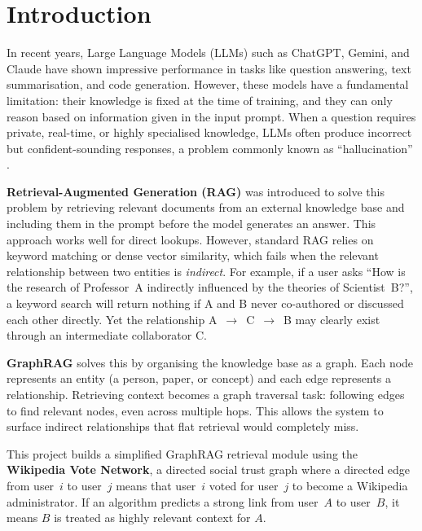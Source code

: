 \documentclass[10pt]{article}
\begin{document}
\section{Introduction}
\label{sec:intro}

In recent years, Large Language Models (LLMs) such as ChatGPT, Gemini, and Claude have shown impressive performance in tasks like question answering, text summarisation, and code generation. However, these models have a fundamental limitation: their knowledge is fixed at the time of training, and they can only reason based on information given in the input prompt. When a question requires private, real-time, or highly specialised knowledge, LLMs often produce incorrect but confident-sounding responses, a problem commonly known as ``hallucination'' \cite{pan2024}.

\textbf{Retrieval-Augmented Generation (RAG)} \cite{lewis2020} was introduced to solve this problem by retrieving relevant documents from an external knowledge base and including them in the prompt before the model generates an answer. This approach works well for direct lookups. However, standard RAG relies on keyword matching or dense vector similarity, which fails when the relevant relationship between two entities is \emph{indirect}. For example, if a user asks ``How is the research of Professor~A indirectly influenced by the theories of Scientist~B?'', a keyword search will return nothing if A and B never co-authored or discussed each other directly. Yet the relationship A~$\rightarrow$~C~$\rightarrow$~B may clearly exist through an intermediate collaborator C.

\textbf{GraphRAG} \cite{edge2024} solves this by organising the knowledge base as a graph. Each node represents an entity (a person, paper, or concept) and each edge represents a relationship. Retrieving context becomes a graph traversal task: following edges to find relevant nodes, even across multiple hops. This allows the system to surface indirect relationships that flat retrieval would completely miss.

This project builds a simplified GraphRAG retrieval module using the \textbf{Wikipedia Vote Network}, a directed social trust graph where a directed edge from user~$i$ to user~$j$ means that user~$i$ voted for user~$j$ to become a Wikipedia administrator. If an algorithm predicts a strong link from user~$A$ to user~$B$, it means $B$ is treated as highly relevant context for $A$.
\end{document}
